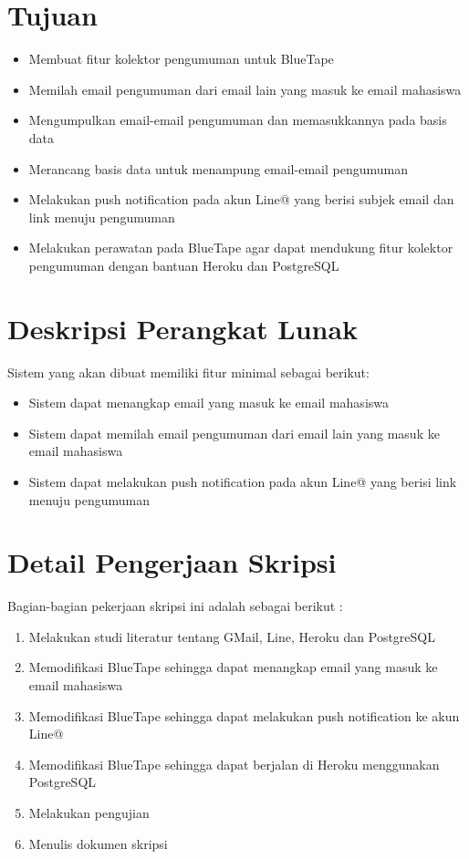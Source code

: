 \documentclass[a4paper,twoside]{article}
\begin{document}
\section{Tujuan}
\begin{itemize}
\item Membuat fitur kolektor pengumuman untuk BlueTape
\item Memilah email pengumuman dari email lain yang masuk ke email mahasiswa
\item Mengumpulkan email-email pengumuman dan memasukkannya pada basis data
\item Merancang basis data untuk menampung email-email pengumuman
\item Melakukan push notification pada akun Line@ yang berisi subjek email dan link menuju pengumuman
\item Melakukan perawatan pada BlueTape agar dapat mendukung fitur kolektor pengumuman dengan bantuan Heroku dan PostgreSQL
\end{itemize}

\section{Deskripsi Perangkat Lunak}
Sistem yang akan dibuat memiliki fitur minimal sebagai berikut:
\begin{itemize}
\item Sistem dapat menangkap email yang masuk ke email mahasiswa
\item Sistem dapat memilah email pengumuman dari email lain yang masuk ke email mahasiswa
\item Sistem dapat melakukan push notification pada akun Line@ yang berisi link menuju pengumuman 
\end{itemize}

\section{Detail Pengerjaan Skripsi}
Bagian-bagian pekerjaan skripsi ini adalah sebagai berikut :
	\begin{enumerate}
		\item Melakukan studi literatur tentang GMail, Line, Heroku dan PostgreSQL
		\item Memodifikasi BlueTape sehingga dapat menangkap email yang masuk ke email mahasiswa
		\item Memodifikasi BlueTape sehingga dapat melakukan push notification ke akun Line@
		\item Memodifikasi BlueTape sehingga dapat berjalan di Heroku menggunakan PostgreSQL
		\item Melakukan pengujian
		\item Menulis dokumen skripsi
	\end{enumerate}
\end{document}
